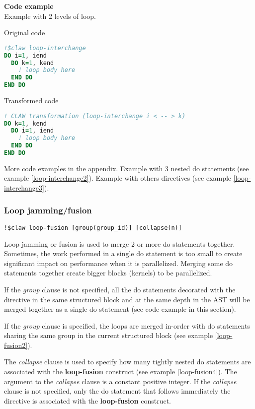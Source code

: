 \textbf{Code example}\\\label{loop-interchange1}
Example with 2 levels of loop.

Original code
\begin{lstlisting}[language=Fortran]
!$claw loop-interchange
DO i=1, iend
  DO k=1, kend
    ! loop body here
  END DO
END DO
\end{lstlisting}

Transformed code
\begin{lstlisting}[language=Fortran]
! CLAW transformation (loop-interchange i < -- > k)
DO k=1, kend
  DO i=1, iend
    ! loop body here
  END DO
END DO
\end{lstlisting}

More code examples in the appendix. Example with 3 nested do statements (see
example \ref{loop-interchange2}). Example with others directives (see example
\ref{loop-interchange3}).

%
%
\subsubsection{Loop jamming/fusion}
\begin{lstlisting}
!$claw loop-fusion [group(group_id)] [collapse(n)]
\end{lstlisting}

Loop jamming or fusion is used to merge 2 or more do statements together.
Sometimes, the work performed in a single do statement is too small to create
significant impact on performance when it is parallelized. Merging some do
statements together create bigger blocks (kernels) to be parallelized.

If the \textit{group} clause is not specified, all the do statements decorated
with the directive in the same structured block and at the same depth in the AST
will be merged together as a single do statement (see code example in this
section).

If the \textit{group} clause is specified, the loops are merged in-order with do
statements sharing the same group in the current structured block (see example
\ref{loop-fusion2}).

The \textit{collapse} clause is used to specify how many tightly nested do
statements are associated with the \textbf{loop-fusion} construct (see example
\ref{loop-fusion4}). The argument to the \textit{collapse} clause is a constant
positive integer. If the \textit{collapse} clause is not specified, only the do
statement that follows immediately the directive is associated with the
\textbf{loop-fusion} construct.


